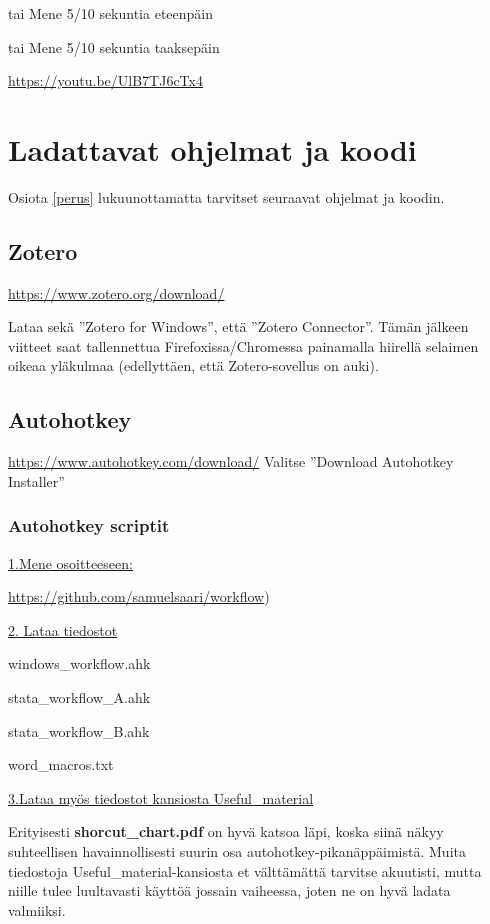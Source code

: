 \documentclass[a5paper,9pt]{scrartcl}
\begin{document}
	\keys{\keys{\arrowkeyright}} tai  Mene 5/10 sekuntia eteenpäin
	
	\keys{\keys{\arrowkeyleft}} tai  Mene 5/10 sekuntia taaksepäin
	
	\url{https://youtu.be/UlB7TJ6cTx4}
    
    \pagebreak \section{Ladattavat ohjelmat ja koodi}
    Osiota \ref{perus}  lukuunottamatta tarvitset seuraavat ohjelmat ja koodin.
    
    \subsection{Zotero}
    \url{https://www.zotero.org/download/}
    
    
    Lataa sekä ''Zotero for Windows'', että ''Zotero Connector''. Tämän jälkeen viitteet saat tallennettua Firefoxissa/Chromessa painamalla hiirellä selaimen oikeaa yläkulmaa (edellyttäen, että Zotero-sovellus on auki).
    
    \subsection{Autohotkey}
    \url{https://www.autohotkey.com/download/}
    Valitse ''Download Autohotkey Installer''
    
    \subsubsection{Autohotkey scriptit} \label{downloads}
   
    \begin{framed}
   
   \underline{1.Mene osoitteeseen:}
   
   \url{https://github.com/samuelsaari/workflow})
   
   \medskip
   
   \underline{2. Lataa tiedostot}
    
    windows\_workflow.ahk
    
    stata\_workflow\_A.ahk
    
    stata\_workflow\_B.ahk
    
    word\_macros.txt
    
    \medskip
    
    \underline{3.Lataa myös tiedostot kansiosta Useful\_material}
    
   
    Erityisesti \textbf{shorcut\_chart.pdf} on hyvä katsoa läpi, koska siinä näkyy suhteellisen havainnollisesti suurin osa autohotkey-pikanäppäimistä. Muita tiedostoja Useful\_material-kansiosta et välttämättä tarvitse akuutisti, mutta niille tulee luultavasti käyttöä jossain vaiheessa, joten ne on hyvä ladata valmiiksi.
    
    \end{framed}
\end{document}
